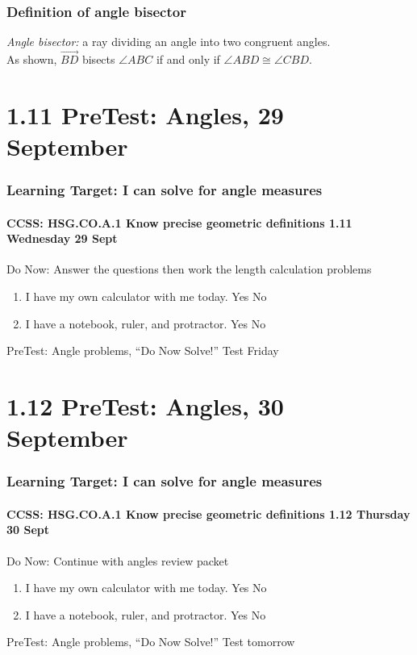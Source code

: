 \documentclass{beamer}
\begin{document}
  \frame
  {
    \frametitle{Definition of angle bisector}
    \emph{Angle bisector:} a ray dividing an angle into two congruent angles.\\[0.5cm]
    As shown, $\overrightarrow{BD}$ bisects $\angle ABC$ if and only if $\angle ABD \cong \angle CBD$. 
    \begin{center}
      \end{center}
  }

  \section{1.11 PreTest: Angles, 29 September}
  \frame
  {
    \frametitle{Learning Target: I can solve for angle measures}
    \framesubtitle{CCSS: HSG.CO.A.1 Know precise geometric definitions  \hfill \alert{1.11 Wednesday 29 Sept}}
  
    \begin{block}{Do Now: Answer the questions then work the length calculation problems}
      
      \begin{enumerate}
      \item I have my own calculator with me today. Yes \qquad No
      \item I have a notebook, ruler, and protractor. Yes \qquad No
      \end{enumerate}
    \end{block}
    PreTest: Angle problems, ``Do Now Solve!'' \alert{Test Friday}
  }


  \section{1.12 PreTest: Angles, 30 September}
  \frame
  {
    \frametitle{Learning Target: I can solve for angle measures}
    \framesubtitle{CCSS: HSG.CO.A.1 Know precise geometric definitions  \hfill \alert{1.12 Thursday 30 Sept}}
  
    \begin{block}{Do Now: Continue with angles review packet}
      
      \begin{enumerate}
      \item I have my own calculator with me today. Yes \qquad No
      \item I have a notebook, ruler, and protractor. Yes \qquad No
      \end{enumerate}
    \end{block}
    PreTest: Angle problems, ``Do Now Solve!'' \alert{Test tomorrow}
  }
\end{document}
